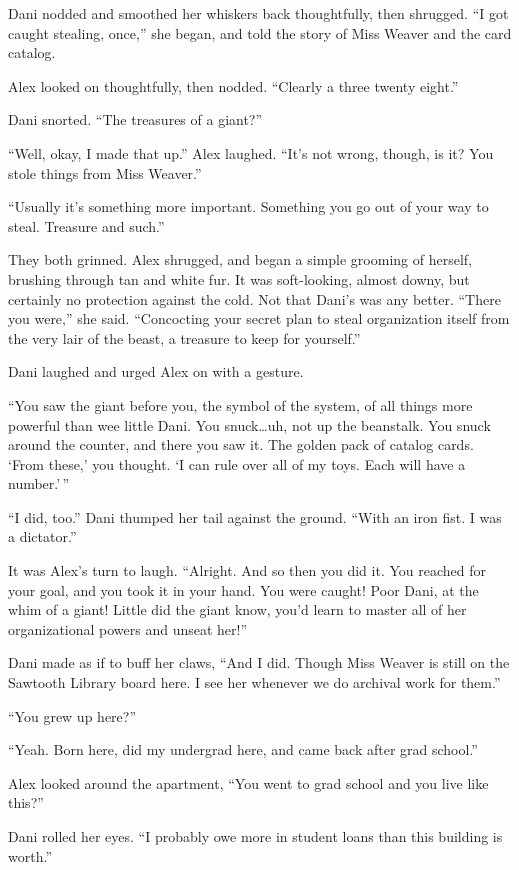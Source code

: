 Dani nodded and smoothed her whiskers back thoughtfully, then shrugged. ``I got caught stealing, once,'' she began, and told the story of Miss Weaver and the card catalog.

Alex looked on thoughtfully, then nodded. ``Clearly a three twenty eight.''

Dani snorted. ``The treasures of a giant?''

``Well, okay, I made that up.'' Alex laughed. ``It's not wrong, though, is it? You stole things from Miss Weaver.''

``Usually it's something more important. Something you go out of your way to steal. Treasure and such.''

They both grinned. Alex shrugged, and began a simple grooming of herself, brushing through tan and white fur. It was soft-looking, almost downy, but certainly no protection against the cold. Not that Dani's was any better. ``There you were,'' she said. ``Concocting your secret plan to steal organization itself from the very lair of the beast, a treasure to keep for yourself.''

Dani laughed and urged Alex on with a gesture.

``You saw the giant before you, the symbol of the system, of all things more powerful than wee little Dani. You snuck\ldots{}uh, not up the beanstalk. You snuck around the counter, and there you saw it. The golden pack of catalog cards. `From these,' you thought. `I can rule over all of my toys. Each will have a number.'\,''

``I did, too.'' Dani thumped her tail against the ground. ``With an iron fist. I was a dictator.''

It was Alex's turn to laugh. ``Alright. And so then you did it. You reached for your goal, and you took it in your hand. You were caught! Poor Dani, at the whim of a giant! Little did the giant know, you'd learn to master all of her organizational powers and unseat her!''

Dani made as if to buff her claws, ``And I did. Though Miss Weaver is still on the Sawtooth Library board here. I see her whenever we do archival work for them.''

``You grew up here?''

``Yeah. Born here, did my undergrad here, and came back after grad school.''

Alex looked around the apartment, ``You went to grad school and you live like this?''

Dani rolled her eyes. ``I probably owe more in student loans than this building is worth.''

